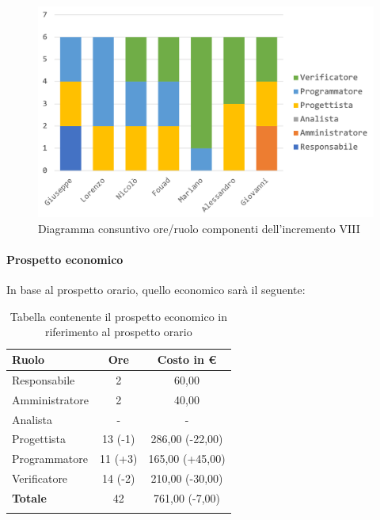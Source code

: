 		\begin{figure}[H]
			\centering
			\includegraphics[width=0.8\linewidth]{images/consuntivo/ConsIncr8-1.png}
			\caption{Diagramma consuntivo ore/ruolo componenti dell'incremento VIII}
			\label{fig:consuntivo diagramma suddivisione ruoli incremento VIII}
		\end{figure}
		
		\paragraph{Prospetto economico}
			In base al prospetto orario, quello economico sarà il seguente: 
		
		\begin{longtable}{|l|c|c|}
			\hline
			\rowcolor{lighter-grayer}
			\textbf{Ruolo} & \textbf{Ore} & \textbf{Costo in € } \\
			\hline
			\endfirsthead
			
			\hline
			Responsabile 	    & 2 & 60,00\\
			\hline 
			\hline
			Amministratore	   & 2 & 40,00\\
			\hline
			\hline
			Analista 				& - & -\\
			\hline
			\hline
			Progettista 		   & 13 (-1) & 286,00 (-22,00)\\
			\hline
			\hline
			Programmatore 	  & 11 (+3) & 165,00 (+45,00)\\
			\hline
			\hline
			Verificatore 		   & 14 (-2) & 210,00 (-30,00)\\
			\hline
			\textbf{Totale} 	 & 42 & 761,00 (-7,00)\\
			\hline
			\caption{Tabella contenente il prospetto economico in riferimento al prospetto orario}
		\end{longtable}

